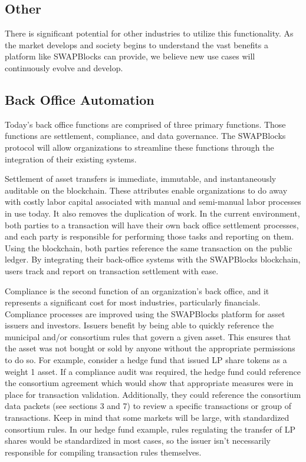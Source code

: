 \documentclass[12pt]{article}
\begin{document}
\subsection{Other}

There is significant potential for other industries to utilize this functionality. As the market develops and society begins to understand the vast benefits a platform like SWAPBlocks can provide, we believe new use cases will continuously evolve and develop.

\subsection{Back Office Automation}
Today’s back office functions are comprised of three primary functions. Those functions are settlement, compliance, and data governance. The SWAPBlocks protocol will allow organizations to streamline these functions through the integration of their existing systems.

Settlement of asset transfers is immediate, immutable, and instantaneously auditable on the blockchain. These attributes enable organizations to do away with costly labor capital associated with manual and semi-manual labor processes in use today. It also removes the duplication of work. In the current environment, both parties to a transaction will have their own back office settlement processes, and each party is responsible for performing those tasks and reporting on them. Using the blockchain, both parties reference the same transaction on the public ledger. By integrating their back-office systems with the SWAPBlocks blockchain, users track and report on transaction settlement with ease.

Compliance is the second function of an organization’s back office, and it represents a significant cost for most industries, particularly financials. Compliance processes are improved using the SWAPBlocks platform for asset issuers and investors. Issuers benefit by being able to quickly reference the municipal and/or consortium rules that govern a given asset. This ensures that the asset was not bought or sold by anyone without the appropriate permissions to do so. For example, consider a hedge fund that issued LP share tokens as a weight 1 asset. If a compliance audit was required, the hedge fund could reference the consortium agreement which would show that appropriate measures were in place for transaction validation. Additionally, they could reference the consortium data packets (see sections 3 and 7) to review a specific transactions or group of transactions. Keep in mind that some markets will be large, with standardized consortium rules. In our hedge fund example, rules regulating the transfer of LP shares would be standardized in most cases, so the issuer isn’t necessarily responsible for compiling transaction rules themselves. 
\end{document}
